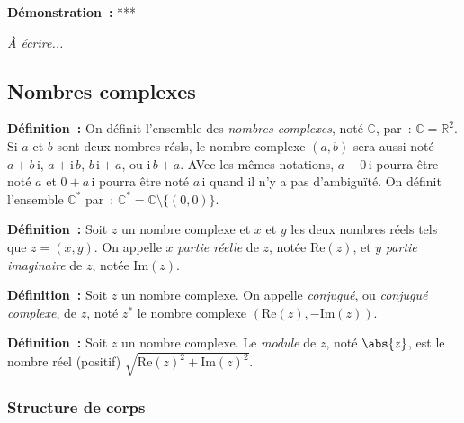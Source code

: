 \medskip

\noindent\textbf{Démonstration :} ***

\medskip

\emph{À écrire...}

\subsection{Nombres complexes}

\noindent\textbf{Définition :} 
    On définit l'ensemble des \emph{nombres complexes}, noté $\mathbb{C}$, par : $\mathbb{C} = \mathbb{R}^2$.
    Si $a$ et $b$ sont deux nombres résls, le nombre complexe $(a, b)$ sera aussi noté $a + b \, \mathrm{i}$, $a + \mathrm{i} \, b$, $b \, \mathrm{i} + a$, ou $\mathrm{i} \, b + a$.
    AVec les mêmes notations, $a + 0 \, \mathrm{i}$ pourra être noté $a$ et $0 + a \, \mathrm{i}$ pourra être noté $a \, \mathrm{i}$ quand il n'y a pas d'ambiguïté.
    On définit l'ensemble $\mathbb{C}^*$ par : $\mathbb{C}^* = \mathbb{C} \setminus \lbrace (0, 0) \rbrace$.

\medskip

\noindent\textbf{Définition :}   
    Soit $z$ un nombre complexe et $x$ et $y$ les deux nombres réels tels que $z = (x, y)$.
    On appelle $x$ \emph{partie réelle} de $z$, notée $\mathrm{Re}(z)$, et $y$ \emph{partie imaginaire} de $z$, notée $\mathrm{Im}(z)$.

\medskip

\noindent\textbf{Définition :}  \sindex[isy]{$*$}
    Soit $z$ un nombre complexe.
    On appelle \emph{conjugué}, ou \emph{conjugué complexe}, de $z$, noté $z^*$ le nombre complexe $\left( \mathrm{Re}(z), - \mathrm{Im}(z) \right)$.

\medskip

\noindent\textbf{Définition :}  \sindex[isy]{$\abs{\cdot}$}
    Soit $z$ un nombre complexe. 
    Le \emph{module} de $z$, noté $\abs{z}$, est le nombre réel (positif) $\sqrt{\mathrm{Re}(z)^2 + \mathrm{Im}(z)^2}$.

\subsubsection{Structure de corps}

